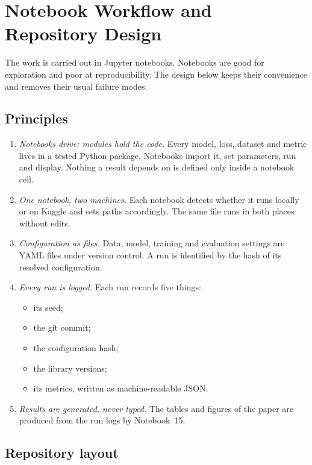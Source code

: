 \chapter{Notebook Workflow and Repository Design}
\label{ch:notebooks}

The work is carried out in Jupyter notebooks. Notebooks are good for
exploration and poor at reproducibility. The design below keeps their
convenience and removes their usual failure modes.

\section{Principles}

\begin{enumerate}
  \item \emph{Notebooks drive; modules hold the code.} Every model, loss,
        dataset and metric lives in a tested Python package. Notebooks import
        it, set parameters, run and display. Nothing a result depends on is
        defined only inside a notebook cell.
  \item \emph{One notebook, two machines.} Each notebook detects whether it
        runs locally or on Kaggle and sets paths accordingly. The same file
        runs in both places without edits.
  \item \emph{Configuration as files.} Data, model, training and evaluation
        settings are YAML files under version control. A run is identified
        by the hash of its resolved configuration.
  \item \emph{Every run is logged.} Each run records five things:
        \begin{itemize}
          \item its seed;
          \item the git commit;
          \item the configuration hash;
          \item the library versions;
          \item its metrics, written as machine-readable JSON.
        \end{itemize}
  \item \emph{Results are generated, never typed.} The tables and figures of
        the paper are produced from the run logs by Notebook~15.
\end{enumerate}

\section{Repository layout}


